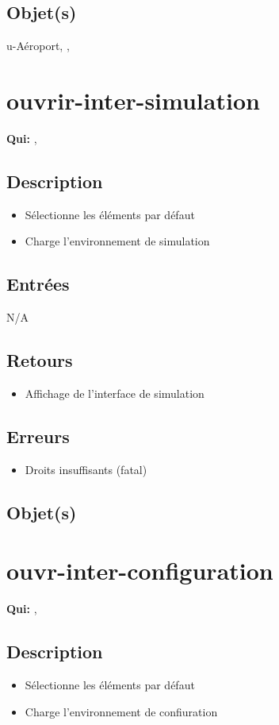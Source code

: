 	\subsection{Objet(s)}
		u-Aéroport, \event, \syslog

\section{ouvrir-inter-simulation}
	\textbf{Qui:} \urt, \us

	\subsection{Description}
	\begin{itemize}
		\item Sélectionne les éléments par défaut
		\item Charge l'environnement de simulation
	\end{itemize}

	\subsection{Entrées}
		N/A

	\subsection{Retours}
	\begin{itemize}
		\item Affichage de l'interface de simulation
	\end{itemize}

	\subsection{Erreurs}
	\begin{itemize}
		\item Droits insuffisants (fatal)
	\end{itemize}

	\subsection{Objet(s)}
		\allobjs

\section{ouvr-inter-configuration}
	\textbf{Qui:} \us, \urt

	\subsection{Description}
	\begin{itemize}
		\item Sélectionne les éléments par défaut
		\item Charge l'environnement de confiuration
	\end{itemize}

